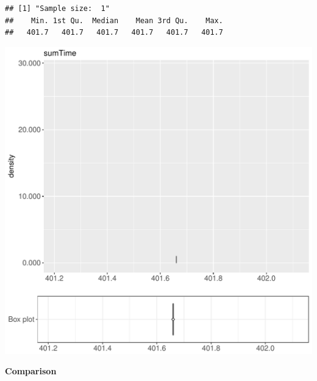 \documentclass{article}\usepackage[]{graphicx}\usepackage[]{color}
\makeatletter
\def\maxwidth{ %
  \ifdim\Gin@nat@width>\linewidth
    \linewidth
  \else
    \Gin@nat@width
  \fi
}
\newenvironment{kframe}{%
 \def\at@end@of@kframe{}%
 \ifinner\ifhmode%
  \def\at@end@of@kframe{\end{minipage}}%
  \begin{minipage}{\columnwidth}%
 \fi\fi%
 \def\FrameCommand##1{\hskip\@totalleftmargin \hskip-\fboxsep
 \colorbox{shadecolor}{##1}\hskip-\fboxsep
     \hskip-\linewidth \hskip-\@totalleftmargin \hskip\columnwidth}%
 \MakeFramed {\advance\hsize-\width
   \@totalleftmargin\z@ \linewidth\hsize
   \@setminipage}}%
 {\par\unskip\endMakeFramed%
 \at@end@of@kframe}
\newenvironment{knitrout}{}{} %
\makeatother
\begin{document}
\begin{knitrout}
\color{fgcolor}\begin{kframe}
\begin{verbatim}
## [1] "Sample size:  1"
##    Min. 1st Qu.  Median    Mean 3rd Qu.    Max. 
##   401.7   401.7   401.7   401.7   401.7   401.7
\end{verbatim}


{\ttfamily\noindent\bfseries{}}\end{kframe}
\includegraphics[width=\maxwidth]{figure/RH2_trivialcaching_password-1} 

\end{knitrout}
  
 \textbf{Comparison}
  
\end{document}
